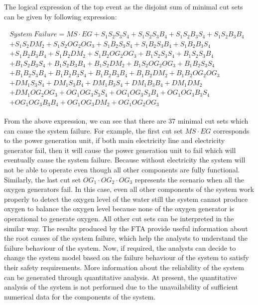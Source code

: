 \documentclass[10pt]{llncs}
\begin{document}
The logical expression of the top event as the disjoint sum of minimal cut sets can be given by following expression:

\begin{align*}
\begin{split}
    System~ Failure=MS\cdot EG+S_1S_2S_3S_4+S_1S_2S_3B_4+S_1S_2B_3S_4+S_1S_2B_3B_4~~~~~~~~~~~~~~~~~~~~~~~~~~~~~~~~~\\+S_1S_2DM_2+S_1S_2OG_2OG_3	+S_1B_2S_3S_4+S_1B_2S_3B_4+S_1B_2B_3S_4~~~~~~~~~~~~~~~~~~~~~~~~~~~~~~~~~~~\\+S_1B_2B_3B_4+S_1B_2DM_2+S_1B_2OG_2OG_3+B_1S_2S_3S_4     +B_1S_2S_3B_4~~~~~~~~~~~~~~~~~~~~~~~~~~~~~~~~~\\+B_1S_2B_3S_4+B_1S_2B_3B_4+B_1S_2DM_2+B_1S_2OG_2OG_3+B_1B_2S_3S_4~~~~~~~~~~~~~~~~~~~~~~~~~~~~~~~~~\\+B_1B_2S_3B_4		+B_1B_2B_3S_4+B_1B_2B_3B_4+B_1B_2DM_2+B_1B_2OG_2OG_3~~~~~~~~~~~~~~~~~~~~~~~~~~~~~~\\+DM_1S_3S_4+DM_1S_3B_4+DM_1B_3S_4			+DM_1B_3B_4+DM_1DM_2~~~~~~~~~~~~~~~~~~~~~~~~~~~~~~~~~~~~~~~~\\+DM_1OG_2OG_3+OG_1OG_3S_3S_4+OG_1OG_3S_3B_4+OG_1OG_3B_3S_4~~~~~~~~~~~~~~~~~~~~~~~~~~~~~~~~~~~\\+OG_1OG_3B_3B_4+OG_1OG_3DM_2+OG_1OG_2OG_3~~~~~~~~~~~~~~~~~~~~~~~~~~~~~~~~~~~~~~~~~~~~~~~~~~~~~~~~~~~~~~~~~
\end{split}  
\end{align*}

From the above expression, we can see that there are 37 minimal cut sets which can cause the system failure. For example, the first cut set $MS\cdot EG$ corresponds to the power generation unit, if both main electricity line and electricity generator fail, then it will cause the power generation unit to fail which will eventually cause the system failure. Because without electricity the system will not be able to operate even though all other components are fully functional. Similarly, the last cut set $OG_1 \cdot OG_2 \cdot OG_3$ represents the scenario when all the oxygen generators fail. In this case, even all other components of the system work properly to detect the oxygen level of the water still the system cannot produce oxygen to balance the oxygen level because none of the oxygen generator is operational to generate oxygen. All other cut sets can be interpreted in the similar way. The results produced by the FTA provide useful information about the root causes of the system failure, which help the analysts to understand the failure behaviour of the system. Now, if required, the analysts can decide to change the system model based on the failure behaviour of the system to satisfy their safety requirements. More information about the reliability of the system can be generated through quantitative analysis. At present, the quantitative analysis of the system is not performed due to the unavailability of sufficient numerical data for the components of the system.  
\end{document}
